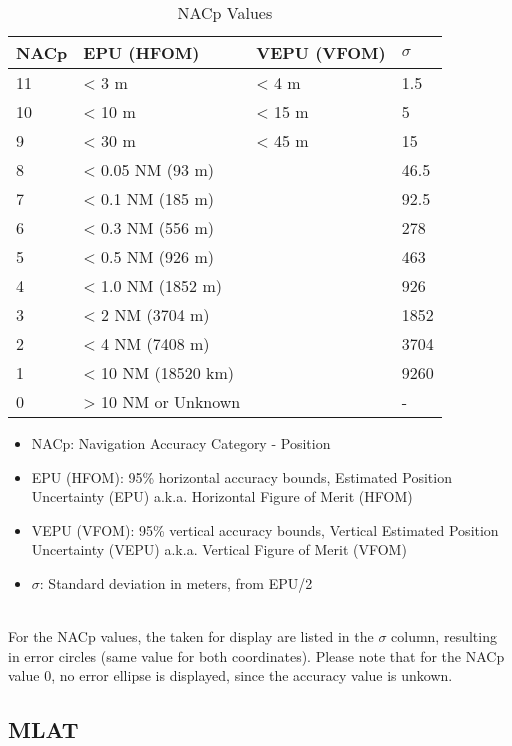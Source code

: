 \begin{table}[H]
  \center
  \begin{tabular}{ | l | l | l | l |}
    \hline
    \textbf{NACp} & \textbf{EPU (HFOM)} & \textbf{VEPU (VFOM)} & \textbf{$\sigma$} \\ \hline
    11  & < 3 m              & < 4 m  & 1.5 \\ \hline
    10  & < 10 m             & < 15 m & 5 \\ \hline
    9   & < 30 m             & < 45 m & 15 \\ \hline
    8   & < 0.05 NM (93 m)   & & 46.5 \\ \hline
    7   & < 0.1 NM (185 m)   & & 92.5 \\ \hline
    6   & < 0.3 NM (556 m)   & & 278 \\ \hline
    5   & < 0.5 NM (926 m)   & & 463 \\ \hline
    4   & < 1.0 NM (1852 m)  & & 926 \\ \hline
    3   & < 2 NM (3704 m)    & & 1852 \\ \hline
    2   & < 4 NM (7408 m)    & & 3704 \\ \hline
    1   & < 10 NM (18520 km) & & 9260 \\ \hline
    0   & > 10 NM or Unknown & & - \\ \hline
  \end{tabular}
  \caption{NACp Values}
\end{table}

\begin{itemize}
\item NACp: Navigation Accuracy Category - Position
\item EPU (HFOM): 95\% horizontal accuracy bounds, Estimated Position Uncertainty (EPU) a.k.a. Horizontal Figure of Merit (HFOM)
\item VEPU (VFOM): 95\% vertical accuracy bounds, Vertical Estimated Position Uncertainty (VEPU) a.k.a. Vertical Figure of Merit (VFOM)
\item $\sigma$: Standard deviation in meters, from EPU/2
\end{itemize}
\ \\

For the NACp values, the taken for display are listed in the $\sigma$ column, resulting in error circles (same value for both coordinates). Please note that for the NACp value 0, no error ellipse is displayed, since the accuracy value is unkown.

\subsection{MLAT}


